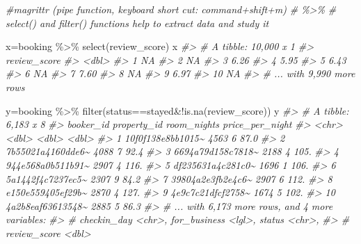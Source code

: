\documentclass[
]{book}
\newenvironment{Shaded}{\begin{snugshade}}{\end{snugshade}}
\newcommand{\CommentTok}[1]{\textcolor[rgb]{0.56,0.35,0.01}{\textit{#1}}}
\newcommand{\FunctionTok}[1]{\textcolor[rgb]{0.00,0.00,0.00}{#1}}
\newcommand{\NormalTok}[1]{#1}
\newcommand{\OtherTok}[1]{\textcolor[rgb]{0.56,0.35,0.01}{#1}}
\newcommand{\SpecialCharTok}[1]{\textcolor[rgb]{0.00,0.00,0.00}{#1}}
\newcommand{\StringTok}[1]{\textcolor[rgb]{0.31,0.60,0.02}{#1}}
\begin{document}
\begin{Shaded}
\begin{Highlighting}[]
\CommentTok{\#magrittr (pipe function, keyboard short cut: command+shift+m)}
 \CommentTok{\# \%\textgreater{}\% }
\CommentTok{\# select() and filter() functions help to extract data and study it}

\NormalTok{x}\OtherTok{=}\NormalTok{booking }\SpecialCharTok{\%\textgreater{}\%} 
  \FunctionTok{select}\NormalTok{(review\_score)}
\NormalTok{x  }
\CommentTok{\#\textgreater{} \# A tibble: 10,000 x 1}
\CommentTok{\#\textgreater{}    review\_score}
\CommentTok{\#\textgreater{}           \textless{}dbl\textgreater{}}
\CommentTok{\#\textgreater{}  1        NA   }
\CommentTok{\#\textgreater{}  2        NA   }
\CommentTok{\#\textgreater{}  3         6.26}
\CommentTok{\#\textgreater{}  4         5.95}
\CommentTok{\#\textgreater{}  5         6.43}
\CommentTok{\#\textgreater{}  6        NA   }
\CommentTok{\#\textgreater{}  7         7.60}
\CommentTok{\#\textgreater{}  8        NA   }
\CommentTok{\#\textgreater{}  9         6.97}
\CommentTok{\#\textgreater{} 10        NA   }
\CommentTok{\#\textgreater{} \# ... with 9,990 more rows}

\NormalTok{y}\OtherTok{=}\NormalTok{booking }\SpecialCharTok{\%\textgreater{}\%} 
  \FunctionTok{filter}\NormalTok{(status}\SpecialCharTok{==}\StringTok{\textquotesingle{}stayed\textquotesingle{}}\SpecialCharTok{\&!}\FunctionTok{is.na}\NormalTok{(review\_score))}
\NormalTok{y}
\CommentTok{\#\textgreater{} \# A tibble: 6,183 x 8}
\CommentTok{\#\textgreater{}    booker\_id         property\_id room\_nights price\_per\_night}
\CommentTok{\#\textgreater{}    \textless{}chr\textgreater{}                   \textless{}dbl\textgreater{}       \textless{}dbl\textgreater{}           \textless{}dbl\textgreater{}}
\CommentTok{\#\textgreater{}  1 10f0f138e8bb1015\textasciitilde{}        4563           6            87.0}
\CommentTok{\#\textgreater{}  2 7b55021a4160dde6\textasciitilde{}        4088           7            92.4}
\CommentTok{\#\textgreater{}  3 6694a79d158c7818\textasciitilde{}        2188           4           105. }
\CommentTok{\#\textgreater{}  4 944e568a0b511b91\textasciitilde{}        2907           4           116. }
\CommentTok{\#\textgreater{}  5 df235631a4c281c0\textasciitilde{}        1696           1           106. }
\CommentTok{\#\textgreater{}  6 5a1442f4c7237ec5\textasciitilde{}        2307           9            84.2}
\CommentTok{\#\textgreater{}  7 39804a2e3fb2e4c6\textasciitilde{}        2907           6           112. }
\CommentTok{\#\textgreater{}  8 e150e559405ef29b\textasciitilde{}        2870           4           127. }
\CommentTok{\#\textgreater{}  9 4e9c7c21dfcf2758\textasciitilde{}        1674           5           102. }
\CommentTok{\#\textgreater{} 10 4a2b8eaf63613548\textasciitilde{}        2885           5            86.3}
\CommentTok{\#\textgreater{} \# ... with 6,173 more rows, and 4 more variables:}
\CommentTok{\#\textgreater{} \#   checkin\_day \textless{}chr\textgreater{}, for\_business \textless{}lgl\textgreater{}, status \textless{}chr\textgreater{},}
\CommentTok{\#\textgreater{} \#   review\_score \textless{}dbl\textgreater{}}
 

\end{Highlighting}
\end{Shaded}
\end{document}
